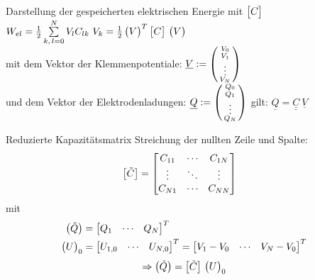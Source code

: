 \documentclass[a6paper]{kartei}
\newenvironment{psmallmatrix}{\left(\begin{smallmatrix}}{\end{smallmatrix}\right)}
\renewenvironment{pmatrix}{\begin{psmallmatrix}}{\end{psmallmatrix}}
\begin{document}
\begin{karte}{Darstellung der gespeicherten elektrischen Energie mit $\begin{bmatrix} C \end{bmatrix}$}
$
W_{el} =  \frac{1}{2} \sum \limits_{k, \, l = 0}^{N} V_{l} C_{lk} \ V_{k} = \frac{1}{2} \begin{pmatrix} V \end{pmatrix}^{T} \begin{bmatrix} C \end{bmatrix} \, \begin{pmatrix} V \end{pmatrix} $\\
mit dem Vektor der Klemmenpotentiale: $\underline{V}:=\begin{pmatrix}V_0\\V_1\\\vdots\\V_N\end{pmatrix}$
\\und dem Vektor der Elektrodenladungen: $\underline{Q}:=\begin{pmatrix}Q_0\\Q_1\\\vdots \\Q_N\end{pmatrix}$ gilt: $\underline{Q}= \underline{\underline{C}}\ \underline{V}$
\end{karte}



\begin{karte}{Reduzierte Kapazitätsmatrix}
Streichung der nullten Zeile und Spalte:
\begin{align}
{\ensuremath{\begin{bmatrix} \tilde{C} \end{bmatrix}}} & = \begin{bmatrix} C_{11} & \cdots & C_{1N} \\ \vdots & \ddots & \vdots \\ C_{N1} & \cdots & C_{NN} \end{bmatrix}
\end{align}
mit
\begin{align}
\begin{pmatrix} \tilde{Q} \end{pmatrix} & = \begin{bmatrix} Q_{1} & \cdots & Q_{N} \end{bmatrix}^{T} \nonumber \\
\begin{pmatrix} U \end{pmatrix}_{0}  & = \begin{bmatrix} U_{1,0} & \cdots & U_{N,0} \end{bmatrix}^{T} =  \begin{bmatrix} V_{1}-V_{0} & \cdots & V_{N}-V_{0}  \end{bmatrix}^{T}
\end{align}
\begin{align}
\Rightarrow  \begin{pmatrix} \tilde{Q} \end{pmatrix} = \begin{bmatrix} \tilde{C} \end{bmatrix} \, \begin{pmatrix} U \end{pmatrix}_{0}
\end{align}
\end{karte}
\end{document}
